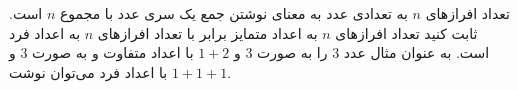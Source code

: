 \EXERCISE
تعداد افرازهای
$n$
به تعدادی عدد به معنای نوشتن جمع یک سری عدد با مجموع
$n$
است. ثابت کنید تعداد افرازهای
$n$
به اعداد متمایز برابر با تعداد افرازهای
$n$
به اعداد فرد است. به عنوان مثال عدد
$3$
را به صورت
$3$
و
$1 + 2$
با اعداد متفاوت و به صورت
$3$
و
$1 + 1 + 1$
با اعداد فرد می‌توان نوشت.
